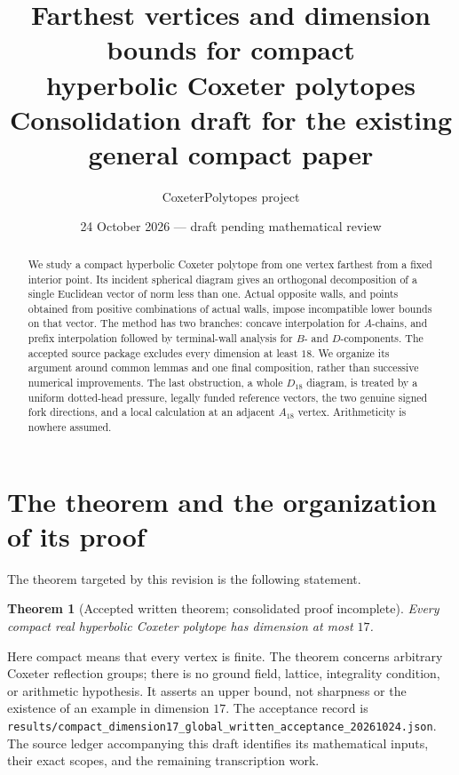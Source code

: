 \documentclass[11pt]{article}
\title{Farthest vertices and dimension bounds for compact\\
hyperbolic Coxeter polytopes\\[4pt]
\large Consolidation draft for the existing general compact paper}
\author{CoxeterPolytopes project}
\date{24 October 2026 --- draft pending mathematical review}
\newtheorem{theorem}{Theorem}[section]
\theoremstyle{definition}
\theoremstyle{remark}
\begin{document}
\maketitle
\begin{center}
\end{center}
\begin{abstract}
We study a compact hyperbolic Coxeter polytope from one vertex farthest
from a fixed interior point. Its incident spherical diagram gives an
orthogonal decomposition of a single Euclidean vector of norm less than
one. Actual opposite walls, and points obtained from positive combinations
of actual walls, impose incompatible lower bounds on that vector.
The method has two branches: concave interpolation for \(A\)-chains, and
prefix interpolation followed by terminal-wall analysis for \(B\)- and
\(D\)-components. The accepted source package excludes every dimension
at least \(18\). We organize its argument around common lemmas and one
final composition, rather than successive numerical improvements.
The last obstruction, a whole \(D_{18}\) diagram, is treated by a uniform
dotted-head pressure, legally funded reference vectors, the two genuine
signed fork directions, and a local calculation at an adjacent
\(A_{18}\) vertex. Arithmeticity is nowhere assumed.
\end{abstract}

\section{The theorem and the organization of its proof}
\label{sec:organization}
The theorem targeted by this revision is the following statement.
\begin{theorem}[Accepted written theorem; consolidated proof incomplete]
\label{thm:main}
Every compact real hyperbolic Coxeter polytope has dimension at most \(17\).
\end{theorem}
Here compact means that every vertex is finite. The theorem concerns
arbitrary Coxeter reflection groups; there is no ground field, lattice,
integrality condition, or arithmetic hypothesis. It asserts an upper
bound, not sharpness or the existence of an example in dimension \(17\).
The acceptance record is
\texttt{results/compact\_dimension17\_global\_written\_acceptance\_20261024.json}.
The source ledger accompanying this draft identifies its mathematical
inputs, their exact scopes, and the remaining transcription work.
\end{document}
